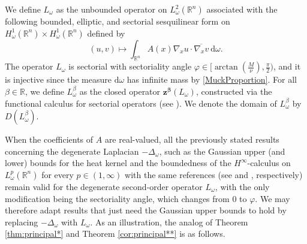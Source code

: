 \documentclass[12pt, letterpaper]{amsart}
\theoremstyle{definition}
\theoremstyle{remark}
\numberwithin{equation}{section}
\begin{document}
{We define $L_\omega$ as the unbounded operator on $L^2_\omega(\mathbb{R}^n)$ associated with the following bounded, elliptic, and sectorial sesquilinear form on $H^1_\omega(\mathbb{R}^n) \times H^1_\omega(\mathbb{R}^n)$ defined by
\begin{equation*}
    (u,v) \mapsto \int_{\mathbb{R}^n} A(x)\nabla_x u \cdot \overline{\nabla_x v}  \ \mathrm d \omega.
\end{equation*}
The operator $L_\omega$ is sectorial with sectoriality angle $\varphi \in [ \arctan\left(\frac{M}{\nu}\right), \frac \pi 2)$, and it is injective since the measure $\mathrm{d}\omega$ has infinite mass by \eqref{MuckProportion}. For all $\beta \in \mathbb{R}$, we define $L_\omega^\beta$ as the closed operator $\mathbf{z^\beta}(L_\omega)$, constructed via the functional calculus for sectorial operators (see \cite{haase2006functional}). We denote the domain of $L_\omega^\beta$ by $D(L_\omega^\beta)$.


When the coefficients of $A$ are real-valued, all the previously stated results concerning the degenerate Laplacian $-\Delta_\omega$, such as the Gaussian upper (and lower) bounds for the heat kernel and the boundedness of the $H^\infty$-calculus on $L^p_\omega(\mathbb{R}^n)$ for every $p \in (1, \infty)$ with the same references {(see \cite{ataei2024fundamental, baadi2025degenerate} and \cite[Theorem 3.1]{duong1996semigroup}, respectively)} remain valid for the degenerate second-order operator $L_\omega$, with the only modification being the sectoriality angle, which changes from $0$ to $\varphi$. We may therefore adapt results that just need the Gaussian upper bounds to hold  by replacing $-\Delta_\omega$ with $L_\omega$. As an illustration, the analog of  Theorem \ref{thm:principal*} and Theorem \ref{cor:principal**} is as follows.

}
\end{document}
